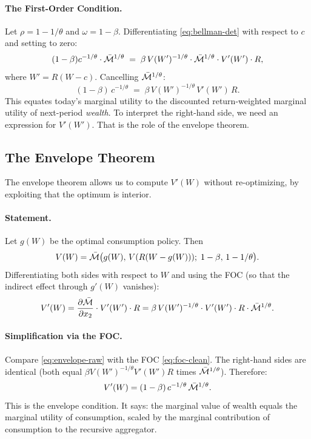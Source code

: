 \paragraph{The First-Order Condition.}
Let $\rho = 1 - 1/\theta$ and $\omega = 1-\beta$. Differentiating \cref{eq:bellman-det} with respect to $c$ and setting to zero:
\begin{equation}
(1-\beta) c^{-1/\theta} \cdot \bar{\mathcal{M}}^{1/\theta} \;=\; \beta \, V(W')^{-1/\theta} \cdot \bar{\mathcal{M}}^{1/\theta} \cdot V'(W') \cdot R,
\label{eq:foc-raw}
\end{equation}
where $W' = R(W-c)$. Cancelling $\bar{\mathcal{M}}^{1/\theta}$:
\begin{equation}
(1-\beta) \, c^{-1/\theta} \;=\; \beta \, V(W')^{-1/\theta} \, V'(W') \, R.
\label{eq:foc-clean}
\end{equation}
This equates today's marginal utility to the discounted return-weighted marginal utility of next-period \emph{wealth}. To interpret the right-hand side, we need an expression for $V'(W')$. That is the role of the envelope theorem.

\subsection{The Envelope Theorem}
\label{subsec:dp-envelope}

The envelope theorem allows us to compute $V'(W)$ without re-optimizing, by exploiting that the optimum is interior.

\paragraph{Statement.}
Let $g(W)$ be the optimal consumption policy. Then
\begin{equation}
V(W) = \bar{\mathcal{M}}\big( g(W), \, V(R(W - g(W))); \; 1-\beta, \, 1-1/\theta \big).
\label{eq:V-at-optimum}
\end{equation}
Differentiating both sides with respect to $W$ and using the FOC (so that the indirect effect through $g'(W)$ vanishes):
\begin{equation}
V'(W) = \frac{\partial \bar{\mathcal{M}}}{\partial x_2} \cdot V'(W') \cdot R = \beta \, V(W')^{-1/\theta} \cdot V'(W') \cdot R \cdot \bar{\mathcal{M}}^{1/\theta}.
\label{eq:envelope-raw}
\end{equation}

\paragraph{Simplification via the FOC.}
Compare \cref{eq:envelope-raw} with the FOC \cref{eq:foc-clean}. The right-hand sides are identical (both equal $\beta V(W')^{-1/\theta} V'(W') R$ times $\bar{\mathcal{M}}^{1/\theta}$). Therefore:
\begin{equation}
V'(W) = (1-\beta) \, c^{-1/\theta} \, \bar{\mathcal{M}}^{1/\theta}.
\label{eq:envelope}
\end{equation}
This is the envelope condition. It says: the marginal value of wealth equals the marginal utility of consumption, scaled by the marginal contribution of consumption to the recursive aggregator.

